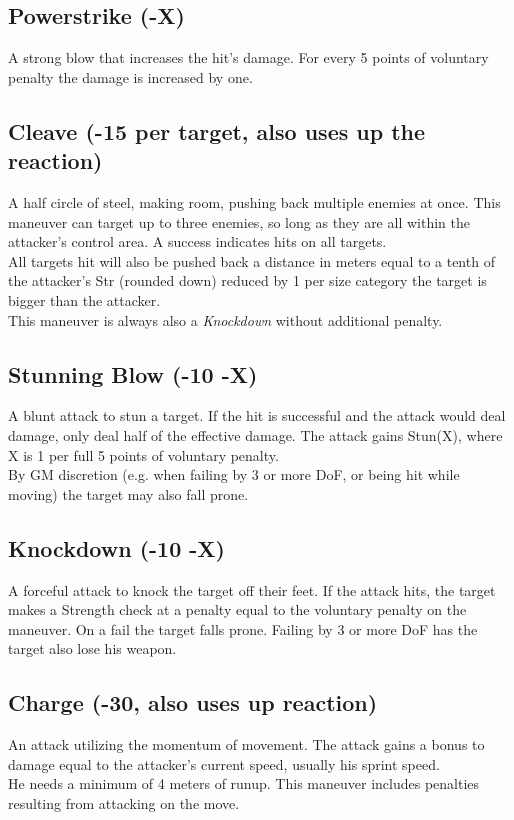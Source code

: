\subsection*{Powerstrike (-X)}
\label{mvr:powerstrike}
A strong blow that increases the hit’s damage. For every 5 points of voluntary penalty the damage is increased by one.
\subsection*{Cleave (-15 per target, also uses up the reaction)}
A half circle of steel, making room, pushing back multiple enemies at once.
This maneuver can target up to three enemies,
	so long as they are all within the attacker’s control area.
A success indicates hits on all targets.\\
All targets hit will also be pushed back a distance in meters equal to
	a tenth of the attacker’s Str (rounded down)
	reduced by 1 per size category the target is bigger than the attacker.\\
This maneuver is always also a \emph{Knockdown} without additional penalty.
\subsection*{Stunning Blow (-10 -X)}
A blunt attack to stun a target.
If the hit is successful and the attack would deal damage,
	only deal half of the effective damage.
The attack gains Stun(X), where X is 1 per full 5 points of voluntary penalty.
\\%
By GM discretion
	(e.g. when failing by 3 or more DoF,
	or being hit while moving)
	the target may also fall prone.
\subsection*{Knockdown (-10 -X)}
A forceful attack to knock the target off their feet. If the attack hits, the target makes a Strength check at a penalty equal to the voluntary penalty on the maneuver. On a fail the target falls prone. Failing by 3 or more DoF has the target also lose his weapon.
\subsection*{Charge (-30, also uses up reaction)}
An attack utilizing the momentum of movement.
The attack gains a bonus to damage equal to the attacker’s current speed,
	usually his sprint speed.
\\%
He needs a minimum of 4 meters of runup.
This maneuver includes penalties resulting from attacking on the move.
